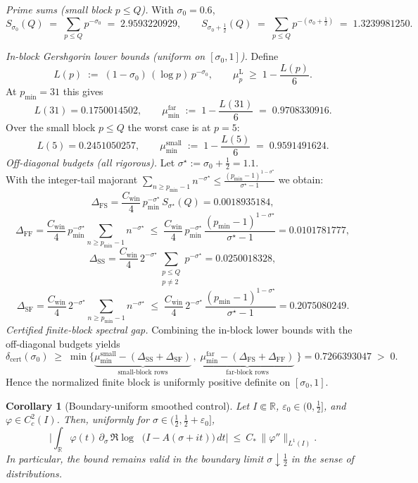 \documentclass[11pt]{article}
\newtheorem{corollary}[theorem]{Corollary}
\theoremstyle{definition}
\theoremstyle{remark}
\newcommand{\R}{\mathbb{R}}
\DeclareMathOperator{\dettwo}{det_2}
\begin{document}
\noindent\emph{Prime sums (small block \(p\le Q\)).} With \(\sigma_0=0.6\),
\[
S_{\sigma_0}(Q)\;=\;\sum_{p\le Q} p^{-\sigma_0}\;=\;2.9593220929,\qquad
S_{\sigma_0+\tfrac12}(Q)\;=\;\sum_{p\le Q} p^{-(\sigma_0+\tfrac12)}\;=\;1.3239981250.
\]

\noindent\emph{In-block Gershgorin lower bounds (uniform on \([\sigma_0,1]\)).}
Define
\[
L(p)\;:=\;(1-\sigma_0)\,(\log p)\,p^{-\sigma_0},\qquad 
\mu_p^{\mathrm L}\;\ge\;1-\frac{L(p)}{6}.
\]
At \(p_{\min}=31\) this gives
\[
L(31)=0.1750014502,\qquad 
\mu_{\min}^{\mathrm{far}}\;:=\;1-\frac{L(31)}{6}\;=\;0.9708330916.
\]
Over the small block \(p\le Q\) the worst case is at \(p=5\):
\[
L(5)=0.2451050257,\qquad 
\mu_{\min}^{\mathrm{small}}\;:=\;1-\frac{L(5)}{6}\;=\;0.9591491624.
\]
\noindent\emph{Off-diagonal budgets (all rigorous).}
Let \(\sigma^\star:=\sigma_0+\tfrac12=1.1\).\\
With the integer-tail majorant \(\displaystyle \sum_{n\ge p_{\min}-1} n^{-\sigma^\star}\le
\frac{(p_{\min}-1)^{1-\sigma^\star}}{\sigma^\star-1}\)
we obtain:
\[
\Delta_{\mathrm{FS}}
=\frac{C_{\mathrm{win}}}{4}\,p_{\min}^{-\sigma^\star}\,S_{\sigma^\star}(Q)
=0.0018935184,
\]
\[
\Delta_{\mathrm{FF}}
=\frac{C_{\mathrm{win}}}{4}\,p_{\min}^{-\sigma^\star}\!
\sum_{n\ge p_{\min}-1}\! n^{-\sigma^\star}
\;\le\;\frac{C_{\mathrm{win}}}{4}\,p_{\min}^{-\sigma^\star}\,
\frac{(p_{\min}-1)^{1-\sigma^\star}}{\sigma^\star-1}
=0.0101781777,
\]
\[
\Delta_{\mathrm{SS}}
=\frac{C_{\mathrm{win}}}{4}\,2^{-\sigma^\star}
\!\sum_{\substack{p\le Q\\ p\neq 2}}\! p^{-\sigma^\star}
=0.0250018328,
\]
\[
\Delta_{\mathrm{SF}}
=\frac{C_{\mathrm{win}}}{4}\,2^{-\sigma^\star}\!
\sum_{n\ge p_{\min}-1}\! n^{-\sigma^\star}
\;\le\;\frac{C_{\mathrm{win}}}{4}\,2^{-\sigma^\star}\,
\frac{(p_{\min}-1)^{1-\sigma^\star}}{\sigma^\star-1}
=0.2075080249.
\]
\noindent\emph{Certified finite-block spectral gap.}
Combining the in-block lower bounds with the off-diagonal budgets yields
\[
\delta_{\mathrm{cert}}(\sigma_0)\;\ge\;
\min\Big\{
\underbrace{\mu_{\min}^{\mathrm{small}}-(\Delta_{\mathrm{SS}}+\Delta_{\mathrm{SF}})}_{\text{small-block rows}}\,,\;
\underbrace{\mu_{\min}^{\mathrm{far}}-(\Delta_{\mathrm{FS}}+\Delta_{\mathrm{FF}})}_{\text{far-block rows}}\
\Big\}
=0.7266393047\;>\;0.
\]
Hence the normalized finite block is uniformly positive definite on \([\sigma_0,1]\).
\begin{corollary}[Boundary-uniform smoothed control]\label{cor:det2-boundary}
Let $I\Subset\R$, $\varepsilon_0\in(0,\tfrac12]$, and $\varphi\in C_c^2(I)$. Then, uniformly for $\sigma\in(\tfrac12,\tfrac12+\varepsilon_0]$,
\[
  \Big|\int_{\R} \varphi(t)\,\partial_\sigma\,\Re\log\dettwo\big(I-A(\sigma+it)\big)\,dt\Big|\ \le\ C_*\,\|\varphi''\|_{L^1(I)}.
\]
In particular, the bound remains valid in the boundary limit $\sigma\downarrow \tfrac12$ in the sense of distributions.
\end{corollary}
\end{document}
